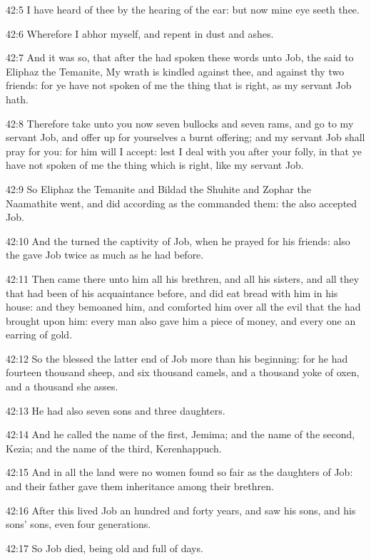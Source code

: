 42:5 I have heard of thee by the hearing of the ear: but now mine eye seeth thee.

42:6 Wherefore I abhor myself, and repent in dust and ashes.

42:7 And it was so, that after the \LORD had spoken these words unto Job, the \LORD said to Eliphaz the Temanite, My wrath is kindled against thee, and against thy two friends: for ye have not spoken of me the thing that is right, as my servant Job hath.

42:8 Therefore take unto you now seven bullocks and seven rams, and go to my servant Job, and offer up for yourselves a burnt offering; and my servant Job shall pray for you: for him will I accept: lest I deal with you after your folly, in that ye have not spoken of me the thing which is right, like my servant Job.

42:9 So Eliphaz the Temanite and Bildad the Shuhite and Zophar the Naamathite went, and did according as the \LORD commanded them: the \LORD also accepted Job.

42:10 And the \LORD turned the captivity of Job, when he prayed for his friends: also the \LORD gave Job twice as much as he had before.

42:11 Then came there unto him all his brethren, and all his sisters, and all they that had been of his acquaintance before, and did eat bread with him in his house: and they bemoaned him, and comforted him over all the evil that the \LORD had brought upon him: every man also gave him a piece of money, and every one an earring of gold.

42:12 So the \LORD blessed the latter end of Job more than his beginning: for he had fourteen thousand sheep, and six thousand camels, and a thousand yoke of oxen, and a thousand she asses.

42:13 He had also seven sons and three daughters.

42:14 And he called the name of the first, Jemima; and the name of the second, Kezia; and the name of the third, Kerenhappuch.

42:15 And in all the land were no women found so fair as the daughters of Job: and their father gave them inheritance among their brethren.

42:16 After this lived Job an hundred and forty years, and saw his sons, and his sons' sons, even four generations.

42:17 So Job died, being old and full of days.

